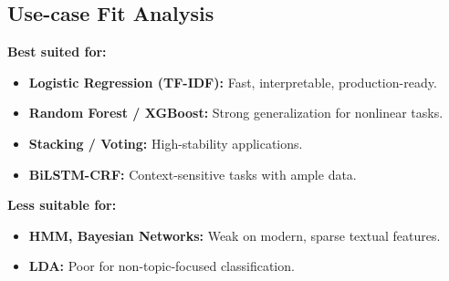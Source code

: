 \subsection{Use-case Fit Analysis}

\textbf{Best suited for:}

\begin{itemize}
    \item \textbf{Logistic Regression (TF-IDF):} Fast, interpretable, production-ready.
    \item \textbf{Random Forest / XGBoost:} Strong generalization for nonlinear tasks.
    \item \textbf{Stacking / Voting:} High-stability applications.
    \item \textbf{BiLSTM-CRF:} Context-sensitive tasks with ample data.
\end{itemize}

\textbf{Less suitable for:}

\begin{itemize}
    \item \textbf{HMM, Bayesian Networks:} Weak on modern, sparse textual features.
    \item \textbf{LDA:} Poor for non-topic-focused classification.
\end{itemize}

\newpage
